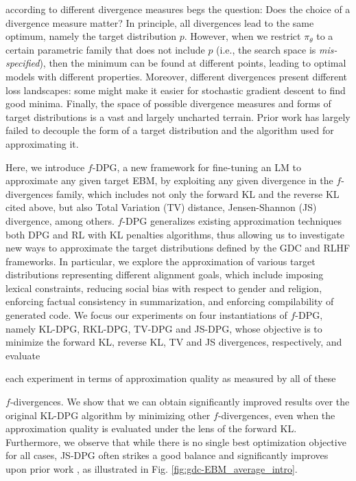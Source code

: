 {according to} different divergence measures begs the question: Does the choice of a divergence measure matter? In principle, all divergences {lead to} the same optimum, namely the target distribution $p$. However, when we restrict ${\pi_\theta}$ to a certain parametric family that does not include $p$ (i.e., the search space is \emph{mis-specified}), then the minimum {can} be found at different points, leading to optimal models with different properties. Moreover, different {divergences} present different loss landscapes: some might make it easier for stochastic gradient descent to find good minima. Finally, the space of possible divergence measures and forms of target distributions is a vast and largely uncharted terrain. Prior work {has} largely failed to decouple the form of a target distribution and the algorithm used for approximating it. 

Here, we introduce $f$-DPG, a new {framework} for fine-tuning {an LM} to approximate any given target EBM, by exploiting any given divergence in the $f$-divergences family, which includes not only the forward {KL} and the reverse KL cited above, but also Total Variation (TV) distance, Jensen-Shannon (JS) {divergence}, among others. $f$-DPG generalizes existing approximation techniques both DPG and RL with KL penalties algorithms, thus allowing us to investigate new {ways} to approximate the target distributions defined by the GDC and RLHF frameworks. In particular, we explore the approximation of various target distributions representing different alignment goals, which include imposing {lexical constraints}, {reducing social bias with respect to gender and religion, } enforcing factual consistency in summarization, and enforcing compilability of generated code. We focus our experiments on four instantiations of $f$-DPG, namely KL-DPG, RKL-DPG, TV-DPG and JS-DPG, whose objective is to minimize the forward KL, reverse KL, TV and JS divergences, respectively, and evaluate 

{each experiment} in terms of approximation quality as measured by all of these 

$f$-divergences. We show that we can obtain significantly improved results over the {original KL-DPG algorithm \cite{parshakova2019distributional}} by minimizing other $f$-divergences, even when the approximation quality is evaluated under the lens of the forward KL. Furthermore, we observe that while there is no single best optimization objective for all cases, JS-DPG often strikes a good balance {and significantly improves upon prior work \cite{khalifa2021distributional,korbak2021controlling}{, as illustrated in Fig. \ref{fig:gdc-EBM_average_intro}.}}

